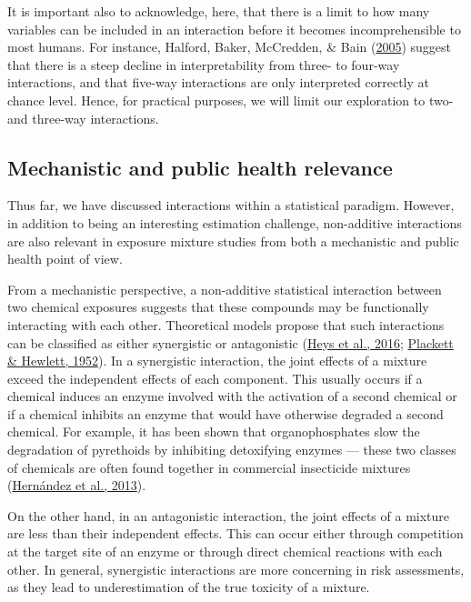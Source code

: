 \documentclass[12pt, twoside]{amherstthesis}
\begin{document}
It is important also to acknowledge, here, that there is a limit to how many variables can be included in an interaction before it becomes incomprehensible to most humans. For instance, Halford, Baker, McCredden, \& Bain (\protect\hyperlink{ref-halford_how_2005}{2005}) suggest that there is a steep decline in interpretability from three- to four-way interactions, and that five-way interactions are only interpreted correctly at chance level. Hence, for practical purposes, we will limit our exploration to two- and three-way interactions.

\hypertarget{mechanistic-and-public-health-relevance}{%
\subsection{Mechanistic and public health relevance}\label{mechanistic-and-public-health-relevance}}

Thus far, we have discussed interactions within a statistical paradigm. However, in addition to being an interesting estimation challenge, non-additive interactions are also relevant in exposure mixture studies from both a mechanistic and public health point of view.

From a mechanistic perspective, a non-additive statistical interaction between two chemical exposures suggests that these compounds may be functionally interacting with each other. Theoretical models propose that such interactions can be classified as either synergistic or antagonistic (\protect\hyperlink{ref-heys_risk_2016}{Heys et al., 2016}; \protect\hyperlink{ref-plackett_quantal_1952}{Plackett \& Hewlett, 1952}). In a synergistic interaction, the joint effects of a mixture exceed the independent effects of each component. This usually occurs if a chemical induces an enzyme involved with the activation of a second chemical or if a chemical inhibits an enzyme that would have otherwise degraded a second chemical. For example, it has been shown that organophosphates slow the degradation of pyrethoids by inhibiting detoxifying enzymes --- these two classes of chemicals are often found together in commercial insecticide mixtures (\protect\hyperlink{ref-hernandez_toxic_2013}{Hernández et al., 2013}).

On the other hand, in an antagonistic interaction, the joint effects of a mixture are less than their independent effects. This can occur either through competition at the target site of an enzyme or through direct chemical reactions with each other. In general, synergistic interactions are more concerning in risk assessments, as they lead to underestimation of the true toxicity of a mixture.
\end{document}
